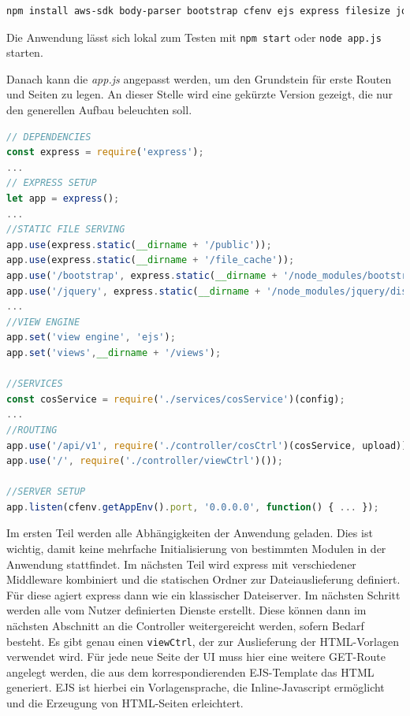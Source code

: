 \begin{lstlisting}[language=bash, caption=Paket Installation und package.json Erzeugung]
npm install aws-sdk body-parser bootstrap cfenv ejs express filesize jquery moment morgan multer promise toastr watson-developer-cloud --save
\end{lstlisting}

Die Anwendung lässt sich lokal zum Testen mit \lstinline|npm start| oder \lstinline|node app.js| starten.
 
Danach kann die \textit{app.js} angepasst werden, um den Grundstein für erste Routen und Seiten zu legen. An dieser Stelle wird eine gekürzte Version gezeigt, die nur den generellen Aufbau beleuchten soll.

\begin{lstlisting}[language=JavaScript, caption=Anpassung der Hauptdatei der Anwendung]
// DEPENDENCIES
const express = require('express');
... 
// EXPRESS SETUP
let app = express();
...
//STATIC FILE SERVING
app.use(express.static(__dirname + '/public'));
app.use(express.static(__dirname + '/file_cache'));
app.use('/bootstrap', express.static(__dirname + '/node_modules/bootstrap/dist'));
app.use('/jquery', express.static(__dirname + '/node_modules/jquery/dist'));
...
//VIEW ENGINE
app.set('view engine', 'ejs');
app.set('views',__dirname + '/views');

//SERVICES
const cosService = require('./services/cosService')(config);
...
//ROUTING
app.use('/api/v1', require('./controller/cosCtrl')(cosService, upload));
app.use('/', require('./controller/viewCtrl')());

//SERVER SETUP
app.listen(cfenv.getAppEnv().port, '0.0.0.0', function() { ... });
\end{lstlisting}

Im ersten Teil werden alle Abhängigkeiten der Anwendung geladen. Dies ist wichtig, damit keine mehrfache Initialisierung von bestimmten Modulen in der Anwendung stattfindet. Im nächsten Teil wird express mit verschiedener Middleware kombiniert und die statischen Ordner zur Dateiauslieferung definiert. Für diese agiert express dann wie ein klassischer Dateiserver.
Im nächsten Schritt werden alle vom Nutzer definierten Dienste erstellt. Diese können dann im nächsten Abschnitt an die Controller weitergereicht werden, sofern Bedarf besteht.
Es gibt genau einen \lstinline|viewCtrl|, der zur Auslieferung der HTML-Vorlagen verwendet wird. Für jede neue Seite der \ac{UI} muss hier eine weitere GET-Route angelegt werden, die aus dem korrespondierenden EJS-Template das HTML generiert.
EJS ist hierbei ein Vorlagensprache, die Inline-Javascript ermöglicht und die Erzeugung von HTML-Seiten erleichtert.


